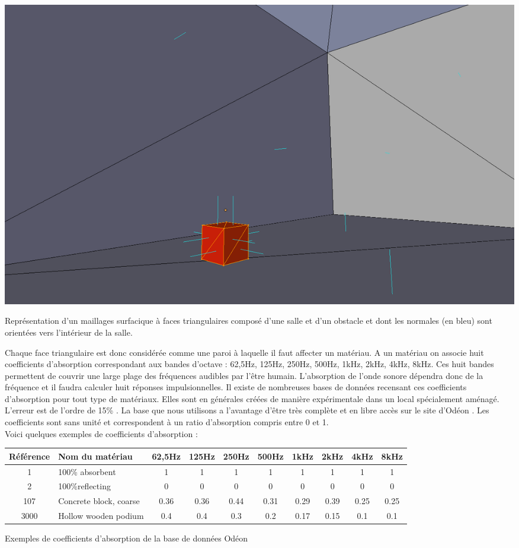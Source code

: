 \begin{figureth}
	\includegraphics[width=0.8\linewidth]{images/normales}
	\caption{Représentation d'un maillages surfacique à faces triangulaires composé d'une salle et d'un obstacle et dont les normales (en bleu) sont orientées vers l'intérieur de la salle.}
	\label{normales}
\end{figureth}

Chaque face triangulaire est donc considérée comme une paroi à laquelle il faut affecter un matériau. A un matériau on associe huit coefficients d'absorption correspondant aux bandes d'octave : 62,5Hz, 125Hz, 250Hz, 500Hz, 1kHz, 2kHz, 4kHz, 8kHz. Ces huit bandes permettent de couvrir une large plage des fréquences audibles par l'être humain. L'absorption de l'onde sonore dépendra donc de la fréquence et il faudra calculer huit réponses impulsionnelles. Il existe de nombreuses bases de données recensant ces coefficients d'absorption pour tout type de matériaux. Elles sont en générales créées de manière expérimentale dans un local spécialement aménagé. L'erreur est de l'ordre de 15\% \cite[]{acouphile}. La base que nous utilisons a l'avantage d'être très complète et en libre accès sur le site d'Odéon \cite[Materials]{odeon}. Les coefficients sont sans unité et correspondent à un ratio d'absorption compris entre 0 et 1. \\

Voici quelques exemples de coefficients d'absorption :
\begin{tableth}
\footnotesize
	\begin{tabular}{| c | m{2.5cm} | *{8}{c|}}
		\hline
		Référence & Nom du matériau & 62,5Hz & 125Hz & 250Hz & 500Hz & 1kHz & 2kHz & 4kHz & 8kHz \\
		  \hline
		  \hline
		   1 & 100\% absorbent & 1 & 1 & 1 & 1 & 1 & 1 & 1 & 1 \\
		   \hline
		2 & 100\%reflecting & 0 & 0 & 0 & 0 & 0 & 0 & 0 & 0 \\
		   \hline
		107 & Concrete block, coarse\footnotemark & 0.36 & 0.36 & 0.44 & 0.31 & 0.29 & 0.39 & 0.25 & 0.25 \\
		   \hline
		3000 & Hollow wooden podium\footnotemark & 0.4 & 0.4 & 0.3 & 0.2 & 0.17 & 0.15 & 0.1 & 0.1 \\
	     \hline
	 \end{tabular}
	\caption{Exemples de coefficients d'absorption de la base de données Odéon}
	\label{exempleOdeon}
\end{tableth}
\addtocounter{footnote}{-1}
\addtocounter{footnote}{1}

